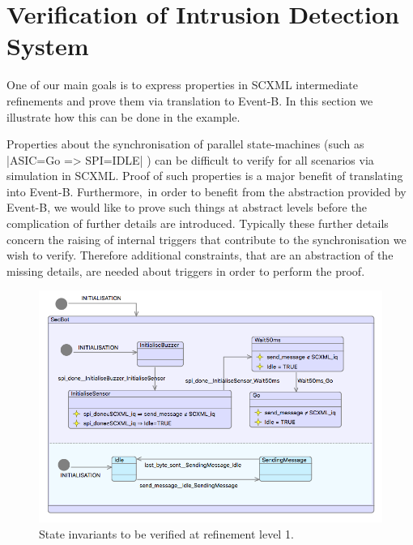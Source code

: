 
\section{Verification of Intrusion Detection System}
\label{sec:example}

One of our main goals is to express properties in SCXML intermediate refinements and prove them via translation to Event-B.
In this section we illustrate how this can be done in the \IDS example.
 
Properties about the synchronisation of parallel state-machines (such as |ASIC=Go => SPI=IDLE|
) can be difficult to verify for all scenarios via simulation in SCXML. 
Proof of such properties is a major benefit of translating into Event-B.  
Furthermore, in order to benefit from the abstraction provided by Event-B, we would like to prove such things at abstract levels before the complication of further details are introduced. 
Typically these further details concern the raising of internal triggers that contribute to the synchronisation we wish to verify. 
Therefore additional constraints, that are an abstraction of the missing details, are needed about triggers in order to perform the proof.

\begin{figure}[!htbp]
	\centering
	\includegraphics[width=1.0\textwidth]{figures/iumlb_verif}
	\caption{State invariants to be verified at refinement level 1.}
	\label{fig:iumlb-verif}
\end{figure}


